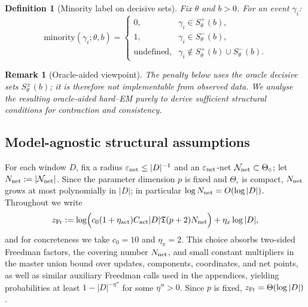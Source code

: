 \documentclass{statsoc}
\newtheorem{definition}[definition]{Definition}
\newtheorem{remark}[remark]{Remark}
\newcommand{\1}{\mathbbm{1}}
\newcommand{\Tmax}{\mathfrak{T}}
\begin{document}
\begin{definition}[Minority label on decisive sets]\label{def:minority}
Fix $\theta$ and $b>0$. For an event $\gamma_i$:
\[
\text{minority}(\gamma_i;\theta,b)=
\begin{cases}
0,& \gamma_i\in S_\theta^+(b),\\
1,& \gamma_i\in S_\theta^-(b),\\
\text{undefined},& \gamma_i\notin S_\theta^+(b)\cup S_\theta^-(b).
\end{cases}
\]
\end{definition}

\begin{remark}[Oracle-aided viewpoint]\label{rem:oracle}
The penalty below uses the oracle decisive sets $S_\theta^\pm(b)$; it is therefore not implementable from observed data. We analyse the resulting oracle-aided hard--EM purely to derive sufficient structural conditions for contraction and consistency.
\end{remark}


\subsection{Model-agnostic structural assumptions}\label{sec:assumptions}

For each window $D$, fix a radius $\varepsilon_{\rm net}\le |D|^{-1}$ and an $\varepsilon_{\rm net}$-net $\mathcal N_{\rm net}\subset\Theta_\circ$; let $N_{\rm net}:=|\mathcal N_{\rm net}|$.
Since the parameter dimension $p$ is fixed and $\Theta_\circ$ is compact, $N_{\rm net}$ grows at most polynomially in $|D|$; in particular $\log N_{\rm net}=O(\log|D|)$. Throughout we write
\begin{equation}\label{eq:z-def}
z_{\rm Fr}:=\log\!\Big(c_0 (1+\eta_{\rm act}) C_{\rm act} |D| \Tmax (p+2) N_{\rm net}\Big) + \eta_x\log|D|,
\end{equation}
and for concreteness we take $c_0=10$ and $\eta_x=2$. This choice absorbs two-sided Freedman factors, the covering number $N_{\rm net}$, and small constant multipliers in the master union bound over updates, components, coordinates, and net points, as well as similar auxiliary Freedman calls used in the appendices, yielding probabilities at least $1-|D|^{-\eta''}$ for some $\eta''>0$. Since $p$ is fixed, $z_{\rm Fr}=\Theta(\log|D|)$.
\end{document}
